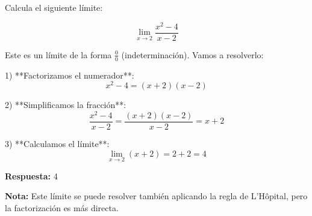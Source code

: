\begin{ejercicio}[
  id=MATU_FUN_008,
  materia_principal=matematicas_preuniversitaria,
  codigo_materia=MATU,
  capitulo=funciones,
  subtema=limites,
  nivel=basico,
  procedencia="Examen CEPRE 2023",
  visibilidad=web_impreso,
  tiempo_estimado=5,
  libros={calculo1, calculo_basico},
  dificultad=2,
  tags={limites},
  youtube_url="",
  mostrar_solucion=true,
  libro_promocion=""
]
Calcula el siguiente límite:

$$\lim_{x \to 2} \frac{x^2 - 4}{x - 2}$$

\begin{solucion}
Este es un límite de la forma $\frac{0}{0}$ (indeterminación). Vamos a resolverlo:

1) **Factorizamos el numerador**:
   $$x^2 - 4 = (x + 2)(x - 2)$$

2) **Simplificamos la fracción**:
   $$\frac{x^2 - 4}{x - 2} = \frac{(x + 2)(x - 2)}{x - 2} = x + 2$$

3) **Calculamos el límite**:
   $$\lim_{x \to 2} (x + 2) = 2 + 2 = 4$$

\textbf{Respuesta:} 4

\textbf{Nota:} Este límite se puede resolver también aplicando la regla de L'Hôpital, pero la factorización es más directa.
\end{solucion}
\end{ejercicio}